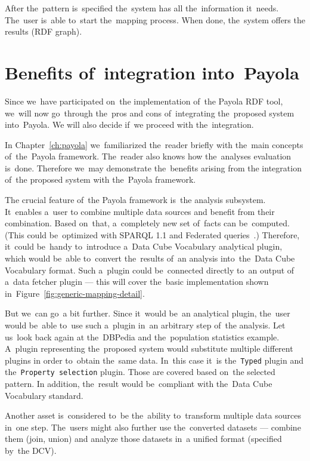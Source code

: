 After the~pattern is~specified the~system has all the~information it~needs. The~user is~able to~start the~mapping process. When done, the~system offers
the results (RDF graph).
\FloatBarrier

\section{Benefits of~integration into~Payola}
\label{why-payola}
Since we~have participated on~the implementation of~the Payola RDF tool, we~will 
now go~through the~pros and cons of~integrating the~proposed system into~Payola.
We will also decide if~we proceed with the~integration.

In Chapter~\ref{ch:payola} we~familiarized the~reader briefly with the~main
concepts of~the~Payola framework. The~reader also knows how the~analyses
evaluation is~done. Therefore we~may demonstrate the~benefits arising from
the integration of~the proposed system with the~Payola framework.

The crucial feature of~the Payola framework is~the analysis subsystem. It~enables a~user
to combine multiple data sources and benefit from their 
combination. Based on~that, a~completely new set of~facts can be~computed.
(This could be~optimized with SPARQL 1.1 and Federated queries~\cite{federated-queries}.) 
Therefore, it~could be~handy to~introduce a~Data Cube Vocabulary analytical 
plugin, which would be~able to~convert the~results of~an analysis into~the~Data 
Cube Vocabulary format. Such a~plugin could be~connected directly to~an output
of a~data fetcher plugin --- this will cover the~basic implementation shown in~Figure~\ref{fig:generic-mapping-detail}.

But we~can go~a bit further. Since it~would be~an analytical plugin, the~user 
would be~able to~use such a~plugin in~an arbitrary step of~the analysis. Let us~look back again
at the~DBPedia and the~population statistics example. A~plugin representing the~proposed
system would substitute multiple different plugins 
in order to~obtain the~same data. In~this case it~is the~\texttt{Typed}
plugin and the~\texttt{Property selection} plugin. Those are covered based on~the selected pattern.
In addition, the~result would be~compliant with the~Data Cube Vocabulary standard.

Another asset is~considered to~be the~ability to~transform multiple data 
sources in~one step. The~users might also further use the~converted datasets --- combine them
(join, union) and analyze those datasets in~a unified format (specified by~the DCV).

